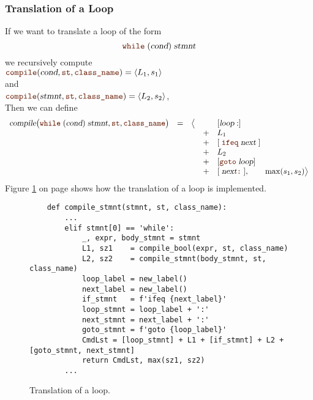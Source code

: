\subsubsection{Translation of a Loop}
If we want to translate a  loop of the form 
\[ \mytt{while}\;(\textsl{cond})\;\textsl{stmnt} \]
we recursively compute
\\[0.2cm]
\hspace*{1.3cm}
$\mytt{compile}(\textsl{cond}, \mytt{st}, \mytt{class\_name}) = \pair(L_1, s_1)$
\\[0.2cm]
and
\\[0.2cm]
\hspace*{1.3cm}
$\mytt{compile}(\textsl{stmnt}, \mytt{st}, \mytt{class\_name}) = \pair(L_2, s_2)$,
\\[0.2cm]
Then we can define
\[
   \begin{array}[t]{lcccl}
     \textsl{compile}\bigl(\mytt{while}\; (\textsl{cond})\;\textsl{stmnt}, \mytt{st}, \mytt{class\_name}\bigr)
     & = & \bigl\langle & & [ \textsl{loop}:]  \\
   &&& + & L_1 \\
   &&& + & [\;\mytt{ifeq}\;\textsl{next}\;] \\
   &&& + & L_2 \\
   &&& + & [\mytt{goto}\;\textsl{loop}] \\
   &&& + & [\;\textsl{next}\mytt{:}\;], \qquad \max(s_1, s_2) \bigr\rangle        
\end{array}
\]
Figure \ref{fig:Compiler.ipynb:compile:while} on page \pageref{fig:Compiler.ipynb:compile:while} shows how the
translation of a loop is implemented.

\begin{figure}[!ht]
\centering
\begin{verbatim}
    def compile_stmnt(stmnt, st, class_name):
        ...
        elif stmnt[0] == 'while':
            _, expr, body_stmnt = stmnt
            L1, sz1    = compile_bool(expr, st, class_name)
            L2, sz2    = compile_stmnt(body_stmnt, st, class_name)
            loop_label = new_label()
            next_label = new_label()
            if_stmnt   = f'ifeq {next_label}'
            loop_stmnt = loop_label + ':'        
            next_stmnt = next_label + ':'
            goto_stmnt = f'goto {loop_label}'
            CmdLst = [loop_stmnt] + L1 + [if_stmnt] + L2 + [goto_stmnt, next_stmnt]
            return CmdLst, max(sz1, sz2)
        ...       
\end{verbatim}
\vspace*{-0.3cm}
\caption{Translation of a loop.}
\label{fig:Compiler.ipynb:compile:while}
\end{figure}

